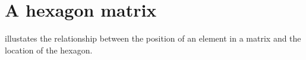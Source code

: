 \documentclass[onecolumn]{article}
\begin{document}
\section*{A hexagon matrix}
 illustates the relationship between the position of an element in a matrix and the location of the hexagon.

\end{document}
